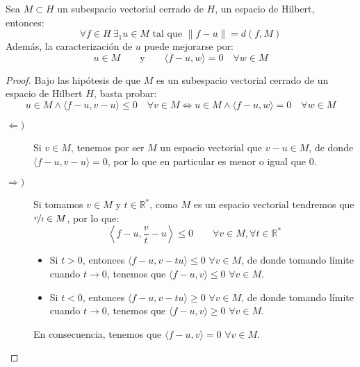 \begin{coro}
    Sea $M\subset H$ un subespacio vectorial cerrado de $H$, un espacio de Hilbert, entonces:
    \begin{equation*}
        \forall f\in H~\exists _1 u \in M \text{\ tal que\ } \|f-u\| = d(f,M)
    \end{equation*}
    Además, la caracterización de $u$ puede mejorarse por:
    \begin{equation*}
        u\in M \qquad \text{y} \qquad \langle f-u,w \rangle  = 0 \quad \forall w\in M
    \end{equation*}
    \begin{proof}
        Bajo las hipótesis de que $M$ es un subespacio vectorial cerrado de un espacio de Hilbert $H$, basta probar:
        \begin{equation*}
            u\in M \land \langle f-u,v-u \rangle \leq 0 \quad \forall v\in M \Longleftrightarrow u\in M \land \langle f-u,w \rangle =0 \quad \forall w\in M
        \end{equation*}
        \begin{description}
            \item [$\Longleftarrow )$] Si $v\in M$, tenemos por ser $M$ un espacio vectorial que $v-u\in M$, de donde $\langle f-u,v-u \rangle =0$, por lo que en particular es menor o igual que 0.
            \item [$\Longrightarrow )$] Si tomamos $v\in M$ y $t\in \mathbb{R}^\ast$, como $M$ es un espacio vectorial tendremos que $\nicefrac{v}{t}\in M$, por lo que:
                \begin{equation*}
                    \left\langle f-u,\frac{v}{t}-u \right\rangle  \leq 0 \qquad \forall v\in M, \forall t\in \mathbb{R}^\ast
                \end{equation*}
                \begin{itemize}
                    \item Si $t>0$, entonces $\langle f-u,v-tu \rangle \leq 0$ $\forall v\in M$, de donde tomando límite cuando $t\to 0$, tenemos que $\langle f-u,v \rangle \leq 0$ $\forall v\in M$.
                    \item Si $t<0$, entonces $\langle f-u,v-tu \rangle \geq 0$ $\forall v\in M$, de donde tomando límite cuando $t\to 0$, tenemos que $\langle f-u,v \rangle \geq 0$ $\forall v\in M$.
                \end{itemize}
                En consecuencia, tenemos que $\langle f-u,v \rangle =0$ $\forall v\in M$.
        \end{description}
    \end{proof}
\end{coro}

